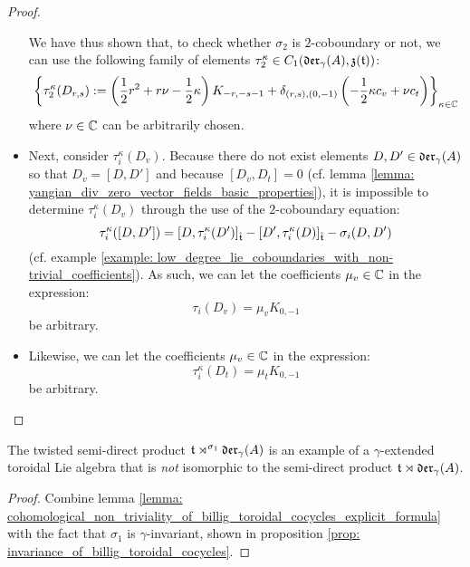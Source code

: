 \begin{proof}
\begin{itemize}
                    We have thus shown that, to check whether $\sigma_2$ is $2$-coboundary or not, we can use the following family of elements $\tau_2^{\kappa} \in C_1(\mathfrak{der}_{\gamma}(A), \mathfrak{z}(\mathfrak{t}))$:
                        $$\left\{ \tau_2^{\kappa}(D_{r, s}) := \left( \frac12 r^2 + r\nu - \frac12 \kappa \right) K_{-r, -s - 1} + \delta_{(r, s), (0, -1)} \left( -\frac12 \kappa c_v + \nu c_t \right) \right\}_{\kappa \in \mathbb{C}}$$
                    where $\nu \in \mathbb{C}$ can be arbitrarily chosen.
                    \item Next, consider $\tau_i^{\kappa}(D_v)$. Because there do not exist elements $D, D' \in \mathfrak{der}_{\gamma}(A)$ so that $D_v = [D, D']$ and because $[D_v, D_t] = 0$ (cf. lemma \ref{lemma: yangian_div_zero_vector_fields_basic_properties}), it is impossible to determine $\tau_i^{\kappa}(D_v)$ through the use of the $2$-coboundary equation:
                        $$\tau_i^{\kappa}([D, D']) = [D, \tau_i^{\kappa}(D')]_{\hat{\mathfrak{t}}} - [D', \tau_i^{\kappa}(D)]_{\hat{\mathfrak{t}}} - \sigma_i(D, D')$$
                    (cf. example \ref{example: low_degree_lie_coboundaries_with_non-trivial_coefficients}). As such, we can let the coefficients $\mu_v \in \mathbb{C}$ in the expression:
                        $$\tau_i(D_v) = \mu_v K_{0, -1}$$
                    be arbitrary.
                    \item Likewise, we can let the coefficients $\mu_v \in \mathbb{C}$ in the expression:
                        $$\tau_i^{\kappa}(D_t) = \mu_t K_{0, -1}$$
                    be arbitrary.
                \end{itemize}
            \end{proof}
        \begin{corollary}
            The twisted semi-direct product $\mathfrak{t} \rtimes^{\sigma_1} \mathfrak{der}_{\gamma}(A)$ is an example of a $\gamma$-extended toroidal Lie algebra that is \textit{not} isomorphic to the semi-direct product $\mathfrak{t} \rtimes \mathfrak{der}_{\gamma}(A)$.
        \end{corollary}
            \begin{proof}
                Combine lemma \ref{lemma: cohomological_non_triviality_of_billig_toroidal_cocycles_explicit_formula} with the fact that $\sigma_1$ is $\gamma$-invariant, shown in proposition \ref{prop: invariance_of_billig_toroidal_cocycles}.
            \end{proof}


